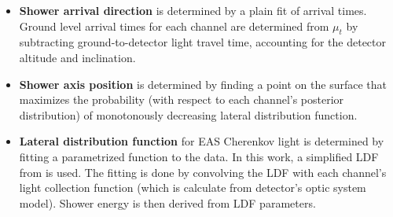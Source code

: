 \begin{itemize}
	\item \textbf{Shower arrival direction} is determined by a plain fit of arrival times. Ground level arrival times for each channel are determined from $\mu_t$ by subtracting ground-to-detector light travel time, accounting for the detector altitude and inclination.
	\item \textbf{Shower axis position} is determined by finding a point on the surface that maximizes the probability (with respect to each channel's posterior distribution) of monotonously decreasing lateral distribution function.
	\item \textbf{Lateral distribution function} for EAS Cherenkov light is determined by fitting a parametrized function to the data. In  this work, a simplified LDF from \cite{Budnev2005} is used. The fitting is done by convolving the LDF with each channel's light collection function (which is calculate from detector's optic system model). Shower energy is then derived from LDF parameters.
\end{itemize}
